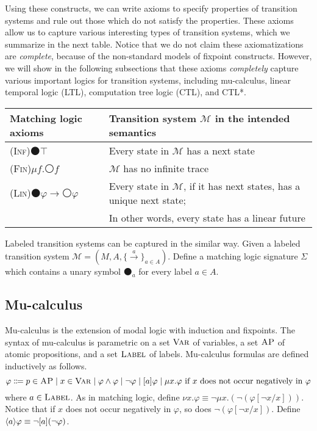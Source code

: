 \documentclass[acmsmall,review,anonymous]{acmart}
\newcommand{\xtodo}[1]{\todo[inline,color=blue!20!white]{(Xiaohong) #1}}
\newcommand{\imp}{\to}
\newcommand{\Var}{\textnormal{\textsc{Var}}}
\newcommand{\sig}{\mathbb{\Sigma}}
\newcommand{\MM}{\mathcal{M}}
\newcommand{\prule}[1]{\textsc{(#1)}}
\newcommand{\AP}{\textsc{AP}}
\newcommand{\Label}{\textsc{Label}}
\newcommand{\wnext}{{\medcirc}}
\newcommand{\snext}{{\medbullet}}
\DeclarePairedDelimiter{\angleBraces}{\langle}{\rangle}
\newcommand{\Inf}{\prule{Inf}\xspace}
\newcommand{\Fin}{\prule{Fin}\xspace}
\newcommand{\Lin}{\prule{Lin}\xspace}
\newcommand{\xto}[1]{\xrightarrow{#1}}
\begin{document}
Using these constructs, we can write axioms to specify properties of transition systems
and rule out those which do not satisfy the properties.
These axioms allow us to capture various interesting types of transition systems,
which we summarize in the next table.
Notice that we do not claim these axiomatizations are \emph{complete},
because of the non-standard models of fixpoint constructs.
However, we will show in the following subsections that these axioms
\emph{completely} capture various important logics for transition systems,
including mu-calculus, linear temporal logic (LTL), computation tree logic (CTL), 
and CTL*.
\begin{center}
\begin{tabular}{ll}
Matching logic axioms & Transition system $\MM$ in the intended semantics
\\\hline
\Inf $\snext \top$ &
Every state in $\MM$ has a next state
\\
\Fin $\mu f . \wnext f$ &
$\MM$ has no infinite trace
\\
\Lin $\snext \varphi \imp \wnext \varphi$ &
Every state in $\MM$, if it has next states, has a unique next state;
\\& In other words, every state has a linear future
\end{tabular}
\end{center} 

Labeled transition systems can be captured in the similar way.
Given a labeled transition system $\MM = (M, A, \{ \xto{a} \}_{a \in A})$.
Define a matching logic signature $\sig$ which contains a unary symbol $\snext_a$
for every label $a \in A$.
\xtodo{Finish this section.}

\subsection{Mu-calculus}
\label{sec_mu_calculus}

Mu-calculus is the extension of modal logic with
induction and fixpoints.
The syntax of mu-calculus is parametric on a set $\Var$ of variables,
a set $\AP$ of atomic propositions,
and a set $\Label$ of labels.
Mu-calculus formulas are defined inductively as follows.
$$
\varphi \Coloneqq
p \in \AP \mid
x \in \Var \mid
\varphi \wedge \varphi \mid
\neg \varphi \mid 
[a] \varphi \mid
\mu x . \varphi \text{ if $x$ does not occur negatively in $\varphi$}
$$
where $a \in \Label$.
As in matching logic, define $\nu x . \varphi \equiv \neg \mu x . (\neg (\varphi[\neg x / x]))$.
Notice that if $x$ does not occur negatively in $\varphi$,
so does $\neg (\varphi[\neg x / x])$.
Define $\angleBraces{a} \varphi \equiv \neg [a] (\neg \varphi)$.
\end{document}

